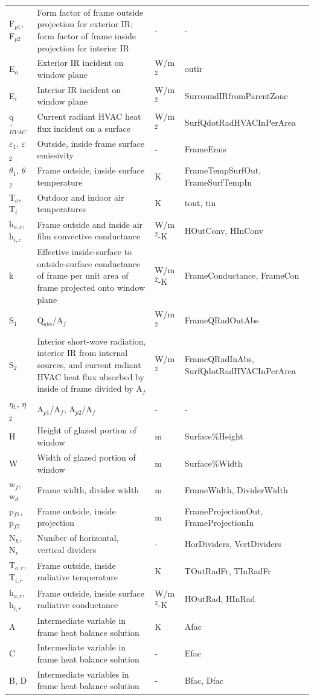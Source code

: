 \begin{longtable}[c]{p{1.0in}p{2.5in}p{1.0in}p{1.5in}}
F\(_{p1}\), F\(_{p2}\) & Form factor of frame outside projection for exterior IR; form factor of frame inside projection for interior IR & - & - \tabularnewline
E\(_{o}\) & Exterior IR incident on window plane & W/m\(^{2}\) & outir \tabularnewline
E\(_{i}\) & Interior IR incident on window plane & W/m\(^{2}\) & SurroundIRfromParentZone \tabularnewline
q\(^{\prime\prime}_{HVAC}\) & Current radiant HVAC heat flux incident on a surface & W/m\(^{2}\) & SurfQdotRadHVACInPerArea \tabularnewline
$\varepsilon$\(_{1}\), $\varepsilon$\(_{2}\) & Outside, inside frame surface emissivity & - & FrameEmis \tabularnewline
$\theta$\(_{1}\), $\theta$\(_{2}\) & Frame outside, inside surface temperature & K & FrameTempSurfOut, FrameSurfTempIn \tabularnewline
T\(_{o}\), T\(_{i}\) & Outdoor and indoor air temperatures & K & tout, tin \tabularnewline
h\(_{o,c}\), h\(_{i,c}\) & Frame outside and inside air film convective conductance & W/m\(^{2}\)-K & HOutConv, HInConv \tabularnewline
k & Effective inside-surface to outside-surface conductance of frame per unit area of frame projected onto window plane & W/m\(^{2}\)-K & FrameConductance, FrameCon \tabularnewline
S\(_{1}\) & Q\(_{abs}\)/A\(_{f}\) & W/m\(^{2}\) & FrameQRadOutAbs \tabularnewline
S\(_{2}\) & Interior short-wave radiation, interior IR from internal sources, and current radiant HVAC heat flux absorbed by inside of frame divided by A\(_{f}\) & W/m\(^{2}\) & FrameQRadInAbs, SurfQdotRadHVACInPerArea \tabularnewline
$\eta$\(_{1}\), $\eta$\(_{2}\) & A\(_{p1}\)/A\(_{f}\), A\(_{p2}\)/A\(_{f}\) & - & - \tabularnewline
H & Height of glazed portion of window & m & Surface\%Height \tabularnewline
W & Width of glazed portion of window & m & Surface\%Width \tabularnewline
w\(_{f}\), w\(_{d}\) & Frame width, divider width & m & FrameWidth, DividerWidth \tabularnewline
p\(_{f1}\), p\(_{f2}\) & Frame outside, inside projection & m & FrameProjectionOut, FrameProjectionIn \tabularnewline
N\(_{h}\), N\(_{v}\) & Number of horizontal, vertical dividers & - & HorDividers, VertDividers \tabularnewline
T\(_{o,r}\), T\(_{i,r}\) & Frame outside, inside radiative temperature & K & TOutRadFr, TInRadFr \tabularnewline
h\(_{o,r}\), h\(_{i,r}\) & Frame outside, inside surface radiative conductance & W/m\(^{2}\)-K & HOutRad, HInRad \tabularnewline
A & Intermediate variable in frame heat balance solution & K & Afac \tabularnewline
C & Intermediate variable in frame heat balance solution & - & Efac \tabularnewline
B, D & Intermediate variables in frame heat balance solution & - & Bfac, Dfac \tabularnewline
\bottomrule
\end{longtable}


